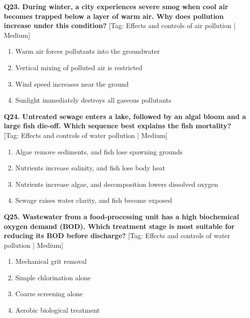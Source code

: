 \noindent\textbf{Q23. During winter, a city experiences severe smog when cool air becomes trapped below a layer of warm air. Why does pollution increase under this condition?} \hfill [Tag: Effects and controls of air pollution | Medium]
\begin{enumerate}[label=(\alph*),topsep=2pt,itemsep=1pt,partopsep=0pt,parsep=0pt]
    \item {Warm air forces pollutants into the groundwater}
    \item {Vertical mixing of polluted air is restricted}
    \item {Wind speed increases near the ground}
    \item {Sunlight immediately destroys all gaseous pollutants}
\end{enumerate}
\vspace{2mm}

\noindent\textbf{Q24. Untreated sewage enters a lake, followed by an algal bloom and a large fish die-off. Which sequence best explains the fish mortality?} \hfill [Tag: Effects and controls of water pollution | Medium]
\begin{enumerate}[label=(\alph*),topsep=2pt,itemsep=1pt,partopsep=0pt,parsep=0pt]
    \item {Algae remove sediments, and fish lose spawning grounds}
    \item {Nutrients increase salinity, and fish lose body heat}
    \item {Nutrients increase algae, and decomposition lowers dissolved oxygen}
    \item {Sewage raises water clarity, and fish become exposed}
\end{enumerate}
\vspace{2mm}

\noindent\textbf{Q25. Wastewater from a food-processing unit has a high biochemical oxygen demand (BOD). Which treatment stage is most suitable for reducing its BOD before discharge?} \hfill [Tag: Effects and controls of water pollution | Medium]
\begin{enumerate}[label=(\alph*),topsep=2pt,itemsep=1pt,partopsep=0pt,parsep=0pt]
    \item {Mechanical grit removal}
    \item {Simple chlorination alone}
    \item {Coarse screening alone}
    \item {Aerobic biological treatment}
\end{enumerate}
\vspace{2mm}

